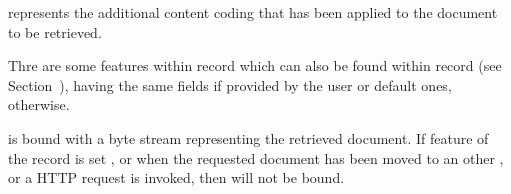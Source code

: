\documentclass{ozdoc}
\begin{document}
\begin{mozartDESCRIPTION}
 represents the additional content coding that has been applied to the document to be retrieved. \mozartEMPTY
{}\mozartENTRYHASCODE
\begin{mozartSYNOPSIS}
\begin{mozartCODEDISPLAY}\mozartFACETEXT{)\mozartSPACE{}}\end{mozartCODEDISPLAY}
\end{mozartSYNOPSIS}
\mozartITEM Thre are some features within  record which can also be found within  record (see Section~), having the same fields if provided by the user or default ones, otherwise.   \mozartEMPTY


 is bound with a byte stream representing the retrieved document. If  feature of the  record is set , or when the requested document has been moved to an other , or a  HTTP request is invoked, then  will not be bound.


\end{mozartDESCRIPTION}
\end{document}

